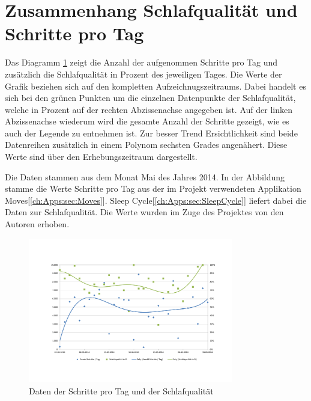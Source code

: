 \section{Zusammenhang Schlafqualität und Schritte pro Tag}
\label{ch:AnalyseUndEvaluierung:sec:ZusammenhangSchlafqualitätProSchrittenAmTag}


Das Diagramm \ref{fig:ZusammenhangSchlafqualitätProSchrittenAmTag} zeigt die Anzahl der aufgenommen Schritte pro Tag und zusätzlich die Schlafqualität in Prozent des jeweiligen Tages.
Die Werte der Grafik beziehen sich auf den kompletten Aufzeichnugszeitraums. 
Dabei handelt es sich bei den grünen Punkten um die einzelnen Datenpunkte der Schlafqualität, welche in Prozent auf der rechten Abzissenachse angegeben ist.
Auf der linken Abzissenachse wiederum wird die gesamte Anzahl der Schritte gezeigt, wie es auch der Legende zu entnehmen ist.
Zur besser Trend Ersichtlichkeit sind beide Datenreihen zusätzlich in einem Polynom sechsten Grades angenähert.
Diese Werte sind über den Erhebungszeitraum dargestellt.

Die Daten stammen aus dem Monat Mai des Jahres 2014.
In der Abbildung stamme die Werte Schritte pro Tag aus der im Projekt verwendeten Applikation Moves[\ref{ch:Apps:sec:Moves}]. 
Sleep Cycle[\ref{ch:Apps:sec:SleepCycle}] liefert dabei die Daten zur Schlafqualität.
Die Werte wurden im Zuge des Projektes von den Autoren erhoben.

\begin{figure}[H]
\centering
        \includegraphics[angle=270,width=0.8\textwidth]{images/Analyse/Sleep-Steps} 
        \caption[Daten der Schritte pro Tag und der Schlafqualität]{Daten der Schritte pro Tag und der Schlafqualität}
        \label{fig:ZusammenhangSchlafqualitätProSchrittenAmTag}
\end{figure}





